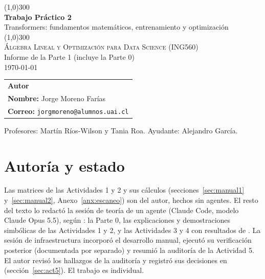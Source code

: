 \documentclass[10pt]{article}
\begin{document}
\begin{titlepage}
  \begin{center}
    \line(1,0){300}\\[0.65cm]
    \huge{\bfseries Trabajo Práctico 2}\\[0.2cm]
    \Large{Transformers: fundamentos matemáticos, entrenamiento y optimización}\\[0.3cm]
    \line(1,0){300}\\[0.4cm]
    \textsc{\Large Álgebra Lineal y Optimización para Data Science (ING560)}\\[0.3cm]
    \large Informe de la Parte 1 (incluye la Parte 0)\\[0.2cm]
    \today\\[0.6cm]
    \vspace{4cm}
  \end{center}
  \begin{minipage}{0.95\textwidth}
    \begin{tabular}{@{}l@{}}
      \textbf{\color{primary}Autor} \\[0.3cm]
      \textbf{Nombre:} Jorge Moreno Farías \\[0.15cm]
      \textbf{Correo:} \texttt{jorgmoreno@alumnos.uai.cl} \\
    \end{tabular}
  \end{minipage}
  \vfill
  {\small Profesores: Martín Ríos-Wilson y Tania Roa. Ayudante: Alejandro García.}
\end{titlepage}

\tableofcontents

\section*{Autoría y estado}

Las matrices de las Actividades 1 y 2 y sus cálculos (secciones~\ref{sec:manual1}
y~\ref{sec:manual2}, Anexo~\ref{anx:escaneo}) son del autor, hechos sin agentes. El resto del
texto lo redactó la sesión de teoría de un agente (Claude Code, modelo Claude Opus 5.5), según
: la Parte 0, las explicaciones y demostraciones simbólicas de las Actividades
1 y 2, y las Actividades 3 y 4 con resultados de . La sesión de
infraestructura incorporó el desarrollo manual, ejecutó su verificación posterior (documentada por
separado) y resumió la auditoría de la Actividad 5. El autor revisó los hallazgos de la auditoría y
registró sus decisiones en  (sección~\ref{sec:act5}). El trabajo
es individual.
\end{document}

